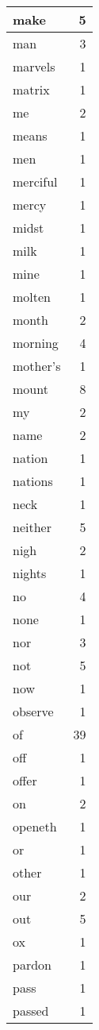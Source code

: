 \begin{center}
\begin{longtable}{l|r}
make & 5 \\ \hline
man & 3 \\ \hline
marvels & 1 \\ \hline
matrix & 1 \\ \hline
me & 2 \\ \hline
means & 1 \\ \hline
men & 1 \\ \hline
merciful & 1 \\ \hline
mercy & 1 \\ \hline
midst & 1 \\ \hline
milk & 1 \\ \hline
mine & 1 \\ \hline
molten & 1 \\ \hline
month & 2 \\ \hline
morning & 4 \\ \hline
mother's & 1 \\ \hline
mount & 8 \\ \hline
my & 2 \\ \hline
name & 2 \\ \hline
nation & 1 \\ \hline
nations & 1 \\ \hline
neck & 1 \\ \hline
neither & 5 \\ \hline
nigh & 2 \\ \hline
nights & 1 \\ \hline
no & 4 \\ \hline
none & 1 \\ \hline
nor & 3 \\ \hline
not & 5 \\ \hline
now & 1 \\ \hline
observe & 1 \\ \hline
of & 39 \\ \hline
off & 1 \\ \hline
offer & 1 \\ \hline
on & 2 \\ \hline
openeth & 1 \\ \hline
or & 1 \\ \hline
other & 1 \\ \hline
our & 2 \\ \hline
out & 5 \\ \hline
ox & 1 \\ \hline
pardon & 1 \\ \hline
pass & 1 \\ \hline
passed & 1 \\ \hline

\end{longtable}
\end{center}
